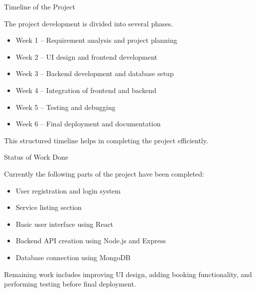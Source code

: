 \documentclass{beamer}
\begin{document}
\begin{frame}{Timeline of the Project}

The project development is divided into several phases.

\begin{itemize}
\item Week 1 – Requirement analysis and project planning
\item Week 2 – UI design and frontend development
\item Week 3 – Backend development and database setup
\item Week 4 – Integration of frontend and backend
\item Week 5 – Testing and debugging
\item Week 6 – Final deployment and documentation
\end{itemize}

This structured timeline helps in completing the project efficiently.
\end{frame}

\begin{frame}{Status of Work Done}

Currently the following parts of the project have been completed:

\begin{itemize}
\item User registration and login system
\item Service listing section
\item Basic user interface using React
\item Backend API creation using Node.js and Express
\item Database connection using MongoDB
\end{itemize}

Remaining work includes improving UI design, adding booking functionality, and performing testing before final deployment.
\end{frame}
\end{document}
